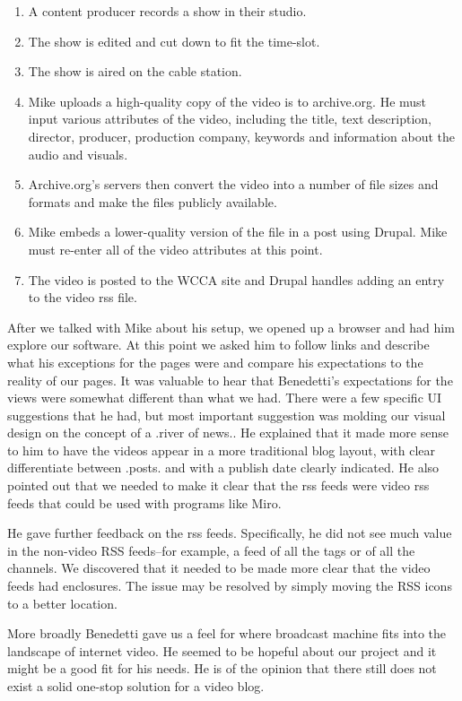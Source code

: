 \documentclass[a4paper,12pt]{report}
\begin{document}
\begin{enumerate}
\item A content producer records a show in their studio. 
\item The show is edited and cut down to fit the time-slot.
\item The show is aired on the cable station. 
\item Mike uploads a high-quality copy of the video is to archive.org. He must input various attributes of the video, 
including the title, text description, director, producer, production company, keywords and information about the audio 
and visuals. 
\item Archive.org's servers then convert the video into a number of file sizes and formats and make the files publicly 
available.
\item Mike embeds a lower-quality version of the file in a post using Drupal. Mike must re-enter all of the video 
attributes at this point.
\item The video is posted to the WCCA site and Drupal handles adding an entry to the video rss file.
\end{enumerate}

After we talked with Mike about his setup, we opened up a browser and had him explore our software. At this point we 
asked him to follow links and describe what his exceptions for the pages were and compare his expectations to the 
reality of our pages. 
It was valuable to hear that Benedetti's expectations for the views were somewhat different than what we had. 
There were a few specific UI suggestions that he had, but most important suggestion was molding our visual design on the 
concept of a .river of news.. 
He explained that it made more sense to him to have the videos appear in a more traditional blog layout, with clear 
differentiate between .posts. and with a publish date clearly indicated. 
He also pointed out that we needed to make it clear that the rss feeds were video rss feeds that could be used with 
programs like Miro.

He gave further feedback on the rss feeds. 
Specifically, he did not see much value in the non-video RSS feeds--for example, a feed of all the tags or of all the 
channels. 
We discovered that it needed to be made more clear that the video feeds had enclosures. 
The issue may be resolved by simply moving the RSS icons to a better location.

More broadly Benedetti gave us a feel for where broadcast machine fits into the landscape of internet video. 
He seemed to be hopeful about our project and it might be a good fit for his needs.
He is of the opinion that there still does not exist a solid one-stop solution for a video blog. 
\end{document}
